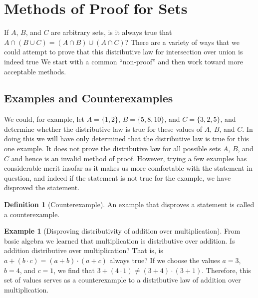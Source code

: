 \documentclass[10pt,]{book}
\theoremstyle{plain}
\theoremstyle{definition}
\newtheorem{definition}[theorem]{Definition}
\theoremstyle{definition}
\newtheorem{example}[theorem]{Example}
\theoremstyle{definition}
\begin{document}
\section[Methods of Proof for Sets ]{Methods of Proof for Sets }\label{s-proof-methods-sets}
\typeout{************************************************}
\typeout{************************************************}
If \(A\), \(B\), and \(C\) are arbitrary sets, is it always true that \(A \cap  (B \cup  C) = (A \cap  B) \cup  (A 
\cap  C)\)?  There are a variety of ways that we could attempt to prove that this distributive law for intersection over union is indeed true We start with a common ``non-proof'' and then work toward more acceptable methods.%
\typeout{************************************************}
\typeout{************************************************}
\subsection[Examples and Counterexamples]{Examples and Counterexamples}\label{ss-examples-and-counterexamples}
We could, for example, let \(A = \{1, 2\}\), \(B = \{5, 8, 10\}\), and \(C = \{3, 2, 5\}\), and determine whether the distributive law is true for these values of \(A\), \(B\), and \(C\). In doing this we will have only determined that the distributive law is true for this one example. It does not prove the distributive law for all possible sets \(A\), \(B\), and \(C\) and hence is an invalid method of proof. However, trying a few examples has considerable merit insofar as it makes us more comfortable with the statement in question, and indeed if the statement is not true for the example, we have disproved the statement.%
\begin{definition}[Counterexample]\label{def-counterexample}
An example that disproves a statement is called a counterexample.%
\end{definition}
\begin{example}[Disproving distributivity of addition over multiplication]\label{ex-addition-over-mult}
 From basic algebra we learned that multiplication is distributive over addition. Is addition distributive over multiplication?
That is, is \(a + (b \cdot  c) = (a + b) \cdot  (a + c)\) always true? If we choose the values \(a = 3\), \(b = 4\), and \(c = 1\), we find that \(3 + (4 \cdot  1) \neq  (3 + 4)\cdot (3 + 1)\). Therefore, this set of values serves as a counterexample to a distributive law of addition over multiplication.%
\end{example}
\typeout{************************************************}
\typeout{************************************************}
\end{document}
